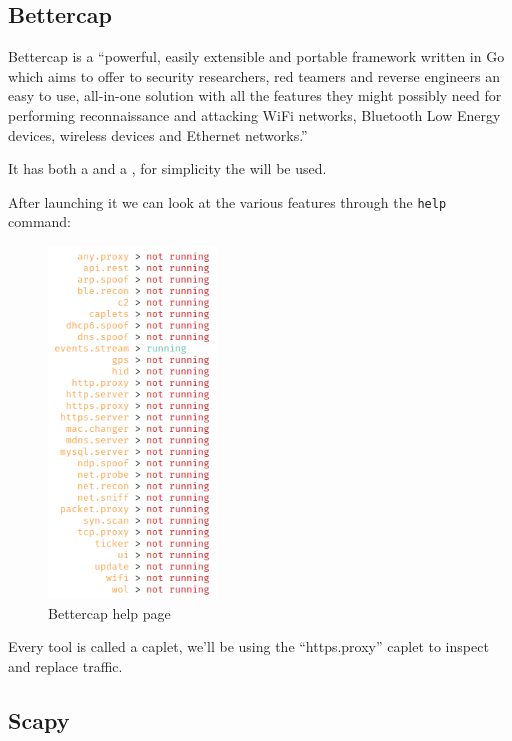 \subsection{Bettercap}

Bettercap is a ``powerful, easily extensible and portable framework written in Go which aims to offer to security researchers, red teamers and reverse engineers an easy to use, all-in-one solution with all the features they might possibly need for performing reconnaissance and attacking WiFi networks, Bluetooth Low Energy devices, wireless  devices and Ethernet networks.''\cite{bettercap}

It has both a  and a , for simplicity the  will be used.

After launching it we can look at the various features through the \verb|help| command:

\begin{figure}[h!]
 \centering
 \includegraphics[width=4.5cm]{img/bettercap_help.png}
 \caption{Bettercap help page}
 \label{fig: bettercap help}
\end{figure}

Every tool is called a caplet, we'll be using the ``https.proxy'' caplet to inspect and replace  traffic.

\newpage

\subsection{Scapy}

